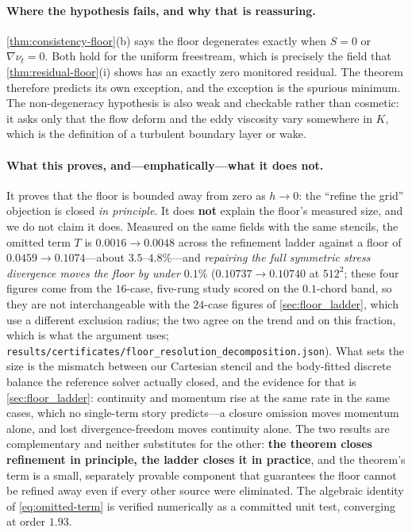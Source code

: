 \paragraph{Where the hypothesis fails, and why that is reassuring.}
\autoref{thm:consistency-floor}(b) says the floor degenerates exactly when $S=0$ or
$\nabla\nu_t=0$. Both hold for the uniform freestream, which is precisely the field that
\autoref{thm:residual-floor}(i) shows has an exactly zero monitored residual. The theorem
therefore predicts its own exception, and the exception is the spurious minimum. The
non-degeneracy hypothesis is also weak and checkable rather than cosmetic: it asks only
that the flow deform and the eddy viscosity vary somewhere in $K$, which is the definition
of a turbulent boundary layer or wake.

\paragraph{What this proves, and---emphatically---what it does not.}
It proves that the floor is bounded away from zero as $h\to0$: the ``refine the grid''
objection is closed \emph{in principle}. It does \textbf{not} explain the floor's measured
size, and we do not claim it does. Measured on the same fields with the same stencils, the
omitted term $T$ is $0.0016\to0.0048$ across the refinement ladder against a floor of
$0.0459\to0.1074$---about $3.5$--$4.8\%$---and \emph{repairing the full symmetric stress
divergence moves the floor by under $0.1\%$} ($0.10737\to0.10740$ at $512^2$;
these four figures come from the $16$-case, five-rung study scored on the
$0.1$-chord band, so they are not interchangeable with the $24$-case figures of
\autoref{sec:floor_ladder}, which use a different exclusion radius; the two agree on
the trend and on this fraction, which is what the argument uses;
\texttt{results/certificates/floor\_resolution\_decomposition.json}). What sets the size is
the mismatch between our Cartesian stencil and the body-fitted discrete balance the
reference solver actually closed, and the evidence for that is
\autoref{sec:floor_ladder}: continuity and momentum rise at the same rate in the same
cases, which no single-term story predicts---a closure omission moves momentum alone, and
lost divergence-freedom moves continuity alone. The two results are complementary and
neither substitutes for the other: \textbf{the theorem closes refinement in principle, the
ladder closes it in practice}, and the theorem's term is a small, separately provable
component that guarantees the floor cannot be refined away even if every other source were
eliminated. The algebraic identity of \eqref{eq:omitted-term} is verified numerically as a
committed unit test, converging at order $1.93$.

